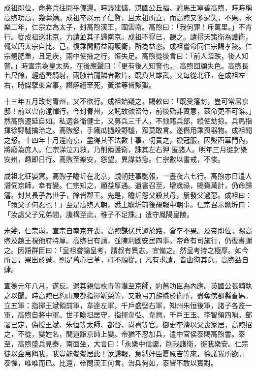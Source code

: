 成祖即位，命將兵往開平備邊。時議建儲，淇國公丘福、駙馬王寧善高煦，時時稱高煦功高，幾奪嫡。成祖卒以元子仁賢，且太祖所立，而高煦又多過失，不果。永樂二年，仁宗立為太子，封高煦漢王，國雲南。高煦曰：「我何罪！斥萬里。」不肯行。從成祖巡北京，力請並其子歸南京。成祖不得已，聽之。請得天策衛為護衛，輒以唐太宗自比。己，復乘間請益兩護衛，所為益恣。成祖嘗命同仁宗謁孝陵。仁宗體肥重，且足疾，兩中使掖之行，恒失足。高煦從後言曰：「前人蹉跌，後人知警。」時宣宗為皇太孫，在後應聲曰：「更有後人知警也。」高煦回顧失色。高煦長七尺餘，輕趫善騎射，兩腋若龍鱗者數片。既負其雄武，又每從北征，在成祖左右，時媒孽東宮事，譖解縉至死，黃淮等皆繫獄。

十三年五月改封青州，又不欲行。成祖始疑之，賜敕曰：「既受籓封，豈可常居京邸！前以雲南遠憚行，今封青州，又託故欲留侍，前後殆非實意，茲命更不可辭。」然高煦遷延自如。私選各衛健士，又募兵三千人，不隸籍兵部，縱使劫掠。兵馬指揮徐野驢擒治之。高煦怒，手鐵瓜撾殺野驢，眾莫敢言。遂僭用乘輿器物。成祖聞之怒。十四年十月還南京，盡得其不法數十事，切責之，褫冠服，囚繫西華門內，將廢為庶人。仁宗涕泣力救，乃削兩護衛，誅其左右狎匿諸人。明年三月徙封樂安州，趣即日行。高煦至樂安，怨望，異謀益急。仁宗數以書戒，不悛。

成祖北征晏駕。高煦子瞻圻在北京，覘朝廷事馳報，一晝夜六七行。高煦亦日遣人潛伺京師，幸有變。仁宗知之，顧益厚遇。遺書召至，增歲祿，賜賚萬計，仍命歸籓。封其長子為世子，餘皆郡王。先是，瞻圻怨父殺其母，屢發父過惡。成祖曰：「爾父子何忍也！」至是高煦入朝，悉上瞻圻前後覘報中朝事。仁宗召示瞻圻曰：「汝處父子兄弟間，讒構至此，稚子不足誅。」遣守鳳陽皇陵。

未幾，仁宗崩，宣宗自南京奔喪。高煦謀伏兵邀於路，倉卒不果。及帝即位，賜高煦及趙王視他府特厚。高煦日有請，並陳利國安民四事。帝命有司施行，仍復書謝之。因語群臣曰：「皇祖嘗諭皇考，謂叔有異志，宜備之。然皇考待之極厚。如今所言，果出於誠，則是舊心已革，可不順從。」凡有求請，皆曲徇其意。高煦益自肆。

宣德元年八月，遂反。遣其親信枚青等潛至京師，約舊功臣為內應。英國公張輔執之以聞。時高煦已約山東都指揮靳榮等，又散弓刀旂幟於衛所，盡奪傍郡縣畜馬。立五軍：指揮王斌領前軍，韋達左軍，千戶盛堅右軍，知州朱恒後軍，諸子各監一軍，高煦自將中軍。世子瞻坦居守，指揮韋弘、韋興，千戶王玉、李智領四哨。部署已定，偽授王斌、朱恒等太師、都督、尚書等官。御史李濬以父喪家居，高煦招之，不從，變姓名，間道詣京師上變。帝猶不忍加兵，遣中官侯泰賜高煦書。泰至，高煦盛兵見泰，南面坐，大言曰：「永樂中信讒，削我護衛，徙我樂安。仁宗徒以金帛餌我，我豈能鬱鬱居此！汝歸報，急縛奸臣夏原吉等來，徐議我所欲。」泰懼，唯唯而已。比還，帝問漢王何言，治兵何如，泰皆不敢以實對。

